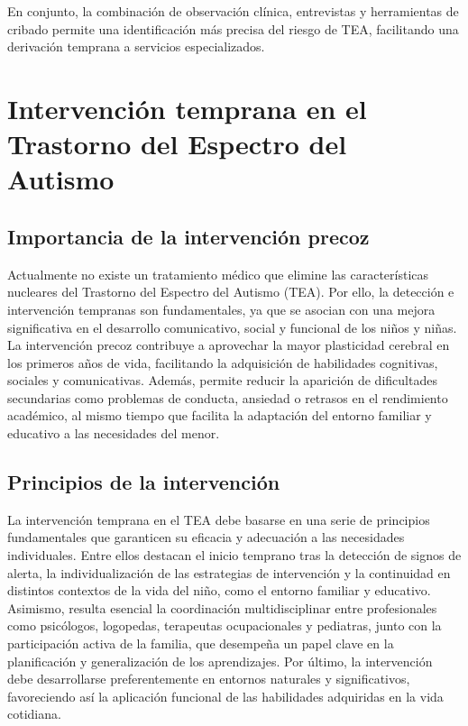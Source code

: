 \documentclass{article}
\begin{document}
En conjunto, la combinación de observación clínica, entrevistas y herramientas de cribado permite una identificación más precisa del riesgo de TEA, facilitando una derivación temprana a servicios especializados.


\section{\textbf{Intervención temprana en el Trastorno del Espectro del Autismo}}
\subsection{\textbf{Importancia de la intervención precoz}}
Actualmente no existe un tratamiento médico que elimine las características nucleares del Trastorno del Espectro del Autismo (TEA). Por ello, la detección e intervención tempranas son fundamentales, ya que se asocian con una mejora significativa en el desarrollo comunicativo, social y funcional de los niños y niñas.\\

La intervención precoz contribuye a aprovechar la mayor plasticidad cerebral en los primeros años de vida, facilitando la adquisición de habilidades cognitivas, sociales y comunicativas. Además, permite reducir la aparición de dificultades secundarias como problemas de conducta, ansiedad o retrasos en el rendimiento académico, al mismo tiempo que facilita la adaptación del entorno familiar y educativo a las necesidades del menor.

\subsection{\textbf{Principios de la intervención}}
La intervención temprana en el TEA debe basarse en una serie de principios fundamentales que garanticen su eficacia y adecuación a las necesidades individuales. Entre ellos destacan el inicio temprano tras la detección de signos de alerta, la individualización de las estrategias de intervención y la continuidad en distintos contextos de la vida del niño, como el entorno familiar y educativo.\\

Asimismo, resulta esencial la coordinación multidisciplinar entre profesionales como psicólogos, logopedas, terapeutas ocupacionales y pediatras, junto con la participación activa de la familia, que desempeña un papel clave en la planificación y generalización de los aprendizajes. Por último, la intervención debe desarrollarse preferentemente en entornos naturales y significativos, favoreciendo así la aplicación funcional de las habilidades adquiridas en la vida cotidiana.
\end{document}
